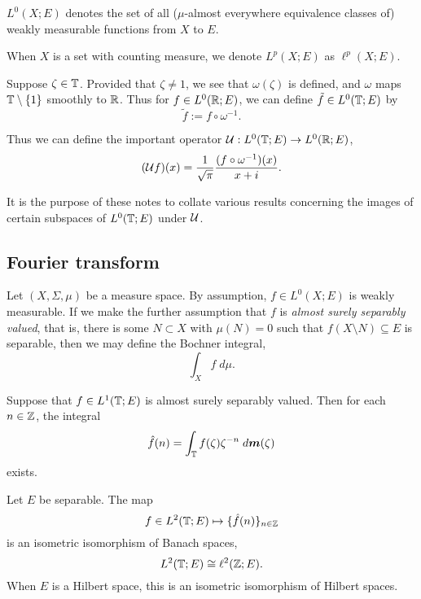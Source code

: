 \documentclass{unswmaths}
\begin{document}
$L^0(X;E)$ denotes the set of all ($\mu$-almost everywhere equivalence classes of)
weakly measurable functions from $X$ to $E$.

When $X$ is a set with counting measure, we denote $L^p(X;E)$ as $\ell^p(X;E)$.

Suppose $\zeta \in \mathbb{T}$. Provided that $\zeta \neq 1$, we see that $\omega(\zeta)$
is defined, and $\omega$ maps $\mathbb{T}\setminus\{1\}$ smoothly to $\mathbb{R}$. Thus for
$f \in L^0(\mathbb{R};E)$, we can define $\tilde{f} \in L^0(\mathbb{T};E)$
by 
\begin{equation*}
    \tilde{f} := f\circ \omega^{-1}.
\end{equation*}

Thus we can define the important operator $\mathcal{U}:L^0(\mathbb{T};E)\rightarrow L^0(\mathbb{R};E)$,
\begin{equation*}
    (\mathcal{U} f)(x) = \frac{1}{\sqrt{\pi}}\frac{(f\circ \omega^{-1})(x)}{x+i}.
\end{equation*}

It is the purpose of these notes to collate various results concerning the images
of certain subspaces of $L^0(\mathbb{T};E)$ under $\mathcal{U}$.

\subsection*{Fourier transform}
Let $(X,\Sigma,\mu)$ be a measure space. By assumption, $f \in L^0(X;E)$ is 
weakly measurable. If we make the further assumption that $f$ is \emph{almost surely
separably valued}, that is, there is some $N \subset X$ with $\mu(N) = 0$
such that $f(X\setminus N) \subseteq E$ is separable, then we 
may define the Bochner integral,
\begin{equation*}
    \int_X f\;d\mu.
\end{equation*}

Suppose that $f \in L^1(\mathbb{T};E)$ is almost surely separably valued. Then
for each $n \in \mathbb{Z}$, the integral
\begin{equation*}
    \hat{f}(n) = \int_{\mathbb{T}} f(\zeta)\zeta^{-n}\;d\boldsymbol{m}(\zeta)
\end{equation*}
exists. 
\begin{theorem}
    Let $E$ be separable.
    The map
    \begin{equation*}
        f \in L^2(\mathbb{T};E)\mapsto \{\hat{f}(n)\}_{n\in\mathbb{Z}}
    \end{equation*}
    is an isometric isomorphism of Banach spaces,
    \begin{equation*}
        L^2(\mathbb{T};E) \cong \ell^2(\mathbb{Z};E).
    \end{equation*}
    When $E$ is a Hilbert space, this is an isometric isomorphism
    of Hilbert spaces.
\end{theorem}       
\end{document}
